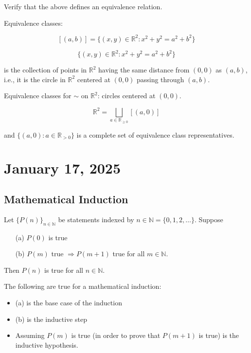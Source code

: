 \documentclass[11pt]{article}
\begin{document}
\begin{problem} Verify that the above defines an equivalence relation.

Equivalence classes:

\[
    [(a, b)] = \{ (x, y) \in \mathbb{R}^2 : x^2 + y^2 = a^2 + b^2 \}
\]

\[
    \{ (x, y) \in \mathbb{R}^2 : x^2 + y^2 = a^2 + b^2 \}
\]

is the collection of points in $\mathbb{R}^2$ having the same distance from
$(0,0)$ as $(a, b)$, i.e., it is the circle in $\mathbb{R}^2$ centered at
$(0,0)$ passing through $(a, b)$.
\end{problem}
\begin{center}
\end{center}

Equivalence classes for $\sim$ on $\mathbb{R}^2$: circles centered at $(0,0)$.

\[
    \mathbb{R}^2 = \bigsqcup_{a \in \mathbb{R}_{\geq 0}} [(a, 0)]
\]

and $\{ (a, 0) : a \in \mathbb{R}_{>0} \}$ is a complete set of equivalence
class representatives.

\section{January 17, 2025}

\subsection{Mathematical Induction}

\begin{definition}
    Let $\{P(n)\}_{n \in \mathbb{N}}$ be statements indexed by $n \in \mathbb{N} = \{0, 1, 2, \ldots\}$. Suppose
    \begin{itemize}
        \item [(a)] $P(0)$ is true
        \item [(b)] $P(m)$ true $\Rightarrow P(m+1)$ true for all $m \in \mathbb{N}$.
    \end{itemize}

    Then $P(n)$ is true for all $n \in \mathbb{N}$.
\end{definition}

\begin{fact}
    The following are true for a mathematical induction:
    \begin{itemize}
        \item (a) is the base case of the induction
        \item (b) is the inductive step
        \item Assuming $P(m)$ is true (in order to prove that $P(m+1)$ is true) is the
              inductive hypothesis.
    \end{itemize}
\end{fact}
\end{document}
